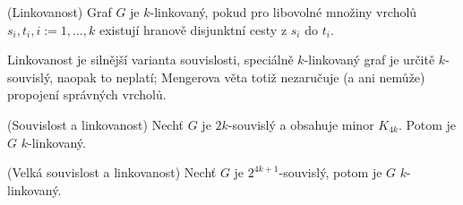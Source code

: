 \df (Linkovanost) Graf $G$ je $k$-linkovaný, pokud pro libovolné množiny 
vrcholů $s_i, t_i, i := 1,\dots, k$ existují hranově disjunktní cesty z $s_i$ 
do $t_i$.

\pzn Linkovanost je silnější varianta souvislosti, speciálně $k$-linkovaný graf 
je určitě $k$-souvislý, naopak to neplatí; Mengerova věta totiž nezaručuje (a 
ani nemůže) propojení správných vrcholů.

\vt (Souvislost a linkovanost) Nechť $G$ je $2k$-souvislý a obsahuje minor 
$K_{4k}$. Potom je $G$ $k$-linkovaný.

\vt (Velká souvislost a linkovanost) Nechť $G$ je $2^{4k+1}$-souvislý, potom je 
$G$ $k$-linkovaný.



